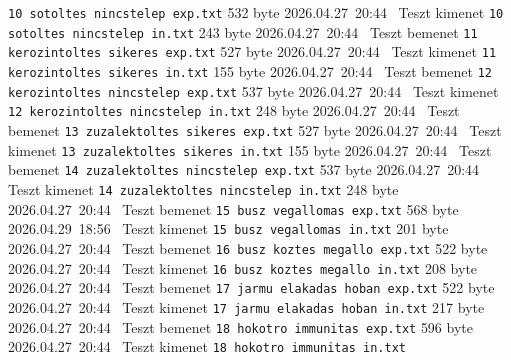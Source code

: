 \begin{fajllista}
    \fajl
    {\texttt{10 sotoltes nincstelep exp.txt}} %
    {532 byte} %
    {2026.04.27~20:44~} %
    {Teszt kimenet} %
    \fajl
    {\texttt{10 sotoltes nincstelep in.txt}} %
    {243 byte} %
    {2026.04.27~20:44~} %
    {Teszt bemenet} %
    \fajl
    {\texttt{11 kerozintoltes sikeres exp.txt}} %
    {527 byte} %
    {2026.04.27~20:44~} %
    {Teszt kimenet} %
    \fajl
    {\texttt{11 kerozintoltes sikeres in.txt}} %
    {155 byte} %
    {2026.04.27~20:44~} %
    {Teszt bemenet} %
    \fajl
    {\texttt{12 kerozintoltes nincstelep exp.txt}} %
    {537 byte} %
    {2026.04.27~20:44~} %
    {Teszt kimenet} %
    \fajl
    {\texttt{12 kerozintoltes nincstelep in.txt}} %
    {248 byte} %
    {2026.04.27~20:44~} %
    {Teszt bemenet} %
    \fajl
    {\texttt{13 zuzalektoltes sikeres exp.txt}} %
    {527 byte} %
    {2026.04.27~20:44~} %
    {Teszt kimenet} %
    \fajl
    {\texttt{13 zuzalektoltes sikeres in.txt}} %
    {155 byte} %
    {2026.04.27~20:44~} %
    {Teszt bemenet} %
    \fajl
    {\texttt{14 zuzalektoltes nincstelep exp.txt}} %
    {537 byte} %
    {2026.04.27~20:44~} %
    {Teszt kimenet} %
    \fajl
    {\texttt{14 zuzalektoltes nincstelep in.txt}} %
    {248 byte} %
    {2026.04.27~20:44~} %
    {Teszt bemenet} %
    \fajl
    {\texttt{15 busz vegallomas exp.txt}} %
    {568 byte} %
    {2026.04.29~18:56~} %
    {Teszt kimenet} %
    \fajl
    {\texttt{15 busz vegallomas in.txt}} %
    {201 byte} %
    {2026.04.27~20:44~} %
    {Teszt bemenet} %
    \fajl
    {\texttt{16 busz koztes megallo exp.txt}} %
    {522 byte} %
    {2026.04.27~20:44~} %
    {Teszt kimenet} %
    \fajl
    {\texttt{16 busz koztes megallo in.txt}} %
    {208 byte} %
    {2026.04.27~20:44~} %
    {Teszt bemenet} %
    \fajl
    {\texttt{17 jarmu elakadas hoban exp.txt}} %
    {522 byte} %
    {2026.04.27~20:44~} %
    {Teszt kimenet} %
    \fajl
    {\texttt{17 jarmu elakadas hoban in.txt}} %
    {217 byte} %
    {2026.04.27~20:44~} %
    {Teszt bemenet} %
    \fajl
    {\texttt{18 hokotro immunitas exp.txt}} %
    {596 byte} %
    {2026.04.27~20:44~} %
    {Teszt kimenet} %
    \fajl
    {\texttt{18 hokotro immunitas in.txt}} %

\end{fajllista}
